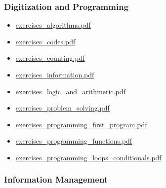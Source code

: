 \documentclass[
  letterpaper,
  DIV=11]{scrartcl}
\providecommand{\tightlist}{%
  \setlength{\itemsep}{0pt}\setlength{\parskip}{0pt}}\usepackage{longtable,booktabs,array}
\begin{document}
\subsubsection{Digitization and
Programming}\label{digitization-and-programming}

\begin{itemize}
\tightlist
\item
  \href{quarto/digitization_and_programming/exercises_algorithms.pdf}{exercises\_algorithms.pdf}
\item
  \href{quarto/digitization_and_programming/exercises_codes.pdf}{exercises\_codes.pdf}
\item
  \href{quarto/digitization_and_programming/exercises_counting.pdf}{exercises\_counting.pdf}
\item
  \href{quarto/digitization_and_programming/exercises_information.pdf}{exercises\_information.pdf}
\item
  \href{quarto/digitization_and_programming/exercises_logic_and_arithmetic.pdf}{exercises\_logic\_and\_arithmetic.pdf}
\item
  \href{quarto/digitization_and_programming/exercises_problem_solving.pdf}{exercises\_problem\_solving.pdf}
\item
  \href{quarto/digitization_and_programming/exercises_programming_first_program.pdf}{exercises\_programming\_first\_program.pdf}
\item
  \href{quarto/digitization_and_programming/exercises_programming_functions.pdf}{exercises\_programming\_functions.pdf}
\item
  \href{quarto/digitization_and_programming/exercises_programming_loops_conditionals.pdf}{exercises\_programming\_loops\_conditionals.pdf}
\end{itemize}

\subsubsection{Information Management}\label{information-management-1}
\end{document}
